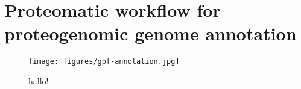 \cleardoublepage
\chapter{Proteomatic workflow for proteogenomic genome annotation}


\begin{figure}
\texttt{[image: figures/gpf-annotation.jpg]}
\caption{
    hallo!
}
\label{fig:appendix-b-pipeline}
\end{figure}
